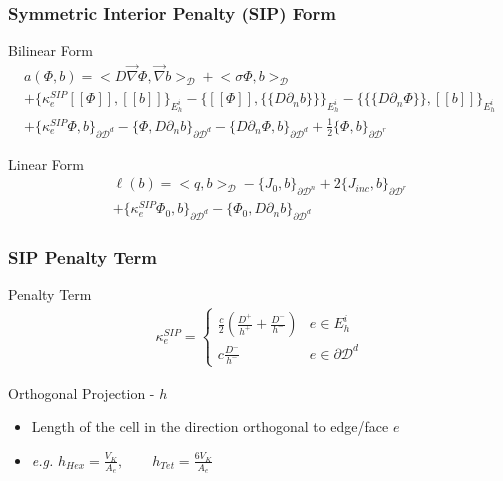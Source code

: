 \documentclass[]{beamer}
\begin{document}
\begin{frame}[t]\frametitle{Symmetric Interior Penalty (SIP) Form}
	\begin{block}{Bilinear Form}
		\begin{gather*}
			 a( \Phi, b)  = \Big<  D \vec{\nabla}  \Phi , \vec{\nabla} b  \Big>_{\mathcal{D}} + \Big<  \sigma   \Phi ,  b  \Big>_{\mathcal{D}}    \\
			+  \Big\{ \kappa_e^{SIP} [\![   \Phi ]\!] , [\![  b ]\!]\Big\}_{E_h^i} - \Big\{  [\![   \Phi ]\!] , \{\!\{  D \partial_n b \}\!\}\Big\}_{E_h^i} -\Big\{ \{\!\{  D \partial_n  \Phi \}\!\} , [\![ b ]\!]\Big\}_{E_h^i} \\
			+ \Big\{ \kappa_e^{SIP}   \Phi ,   b \Big\}_{\partial \mathcal{D}^d} - \Big\{   \Phi  ,  D \partial_n b \Big\}_{\partial \mathcal{D}^d} - \Big\{   D 				\partial_n  \Phi ,   b \Big\}_{\partial \mathcal{D}^d}  +  \frac{1}{2} \Big\{    \Phi ,   b \Big\}_{\partial \mathcal{D}^r}
        	\end{gather*} 
\end{block}
\begin{block}{Linear Form}
		\begin{align*}
			\ell (b) = \Big<  q, b  \Big>_{\mathcal{D}}  - \Big\{   J_{0}, b  \Big\}_{\partial \mathcal{D}^n} +  2 \Big\{   J_{inc}, b  \Big\}_{\partial 				\mathcal{D}^r} \\ + \Big\{ \kappa_e^{SIP}   \Phi_0 ,   b \Big\}_{\partial \mathcal{D}^d} - \Big\{   \Phi_0  ,  D \partial_n b \Big\}_{\partial 					\mathcal{D}^d} 
        	\end{align*} 
    \end{block}
\end{frame}
\begin{frame}[t]\frametitle{SIP Penalty Term}
	\begin{block}{Penalty Term}
		\begin{align*}
			 \kappa_e^{SIP} = 
			\begin{cases}
				\frac{c}{2} \left(  \frac{D^+}{h^+} + \frac{D^-}{h^-} \right) & e \in E_h^i\\ 
				c \frac{D^-}{h^-}& e \in \partial \mathcal{D}^d
			\end{cases}
			\label{eq::SIP_penalty_term}
        	\end{align*}
    \end{block}
	\begin{block}{Orthogonal Projection - $h$}
		\begin{itemize}
			\item Length of the cell in the direction orthogonal to edge/face $e$
			\item {\em e.g.} $ h_{Hex} = \frac{V_K}{A_e}, \qquad h_{Tet} =  \frac{6 V_K}{A_e}$
		\end{itemize}
	\end{block}
\end{frame}
\end{document}
